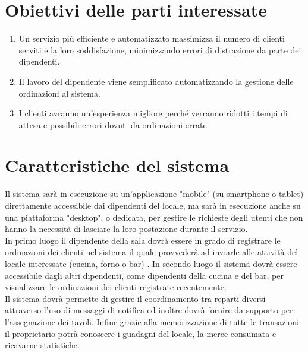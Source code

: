 \section{Obiettivi delle parti interessate}
\begin{enumerate}
    \item Un servizio più efficiente e automatizzato massimizza il numero di clienti serviti e la loro soddisfazione, minimizzando errori di distrazione da parte dei dipendenti.
    \item Il lavoro del dipendente viene semplificato automatizzando la gestione delle ordinazioni al sistema.
    \item I clienti avranno un’esperienza migliore perché verranno ridotti i tempi di attesa e possibili errori dovuti da ordinazioni errate. 
\end{enumerate}

\section{Caratteristiche del sistema}

Il sistema sarà in esecuzione su un’applicazione "mobile" (su smartphone o tablet) direttamente accessibile dai dipendenti del locale, ma sarà in esecuzione anche su una piattaforma "desktop", o dedicata, per gestire le richieste degli utenti che non hanno la necessità di lasciare la loro postazione durante il servizio. \\
In primo luogo il dipendente della sala dovrà essere in grado di registrare le ordinazioni dei clienti nel sistema il quale provvederà ad inviarle alle attività del locale interessate (cucina, forno o bar) . In secondo luogo il sistema dovrà essere accessibile dagli altri dipendenti, come dipendenti della cucina e del bar, per visualizzare le ordinazioni dei clienti registrate recentemente. \\Il sistema dovrà permette di gestire il coordinamento tra reparti diversi attraverso l'uso di messaggi di notifica ed inoltre dovrà fornire da supporto per l’assegnazione dei tavoli.
Infine grazie alla memorizzazione di tutte le transazioni il proprietario potrà conoscere i guadagni del locale, la merce consumata e ricavarne statistiche.
